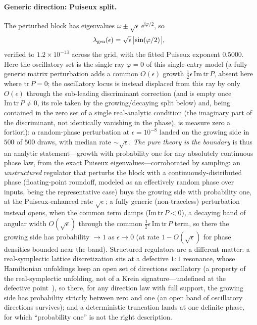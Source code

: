 ﻿\documentclass[11pt]{article}
\newcommand{\ee}{\mathrm{e}}
\newcommand{\ii}{\mathrm{i}}
\theoremstyle{remark}
\begin{document}
\paragraph{Generic direction: Puiseux split.} The perturbed block
has eigenvalues $\omega\pm\sqrt{\epsilon}\,\ee^{\ii\varphi/2}$, so
\begin{equation}
\lambda_{\rm gen}(\epsilon)=\sqrt{\epsilon}\,\bigl|\sin(\varphi/2)
\bigr|,
\label{eq:genlaw}
\end{equation}
verified to $1.2\times10^{-13}$ across the grid, with the fitted
Puiseux exponent $0.5000$. Here the oscillatory set is the single
ray $\varphi=0$ of this single-entry model (a fully generic matrix
perturbation adds a common $O(\epsilon)$ growth $\tfrac12\epsilon\,
\mathrm{Im}\,\mathrm{tr}\,P$, absent here where $\mathrm{tr}\,P=0$; the
oscillatory locus is instead displaced from this ray by only $O(\epsilon)$
through the sub-leading discriminant correction (and is empty once $\mathrm{Im}\,\mathrm{tr}\,P\neq0$, its role taken by the
growing/decaying split below) and, being contained in the zero set of a single real-analytic
condition (the imaginary part of the discriminant, not identically
vanishing in the phase), is measure zero a fortiori): a random-phase perturbation at $\epsilon=10^{-8}$
landed on the growing side in $500$ of $500$ draws, with median
rate $\sim\sqrt\epsilon$. \emph{The pure theory is the boundary}
is thus an analytic statement---growth with probability one for
any absolutely continuous phase law, from the exact Puiseux
eigenvalues---corroborated by sampling: an \emph{unstructured} regulator
that perturbs the block with a continuously-distributed phase
(floating-point roundoff, modeled as an effectively random phase over inputs,
being the representative case) buys the growing
side with probability one, at the Puiseux-enhanced rate $\sqrt\epsilon$;
a fully generic (non-traceless) perturbation instead opens, when the common
term damps ($\mathrm{Im}\,\mathrm{tr}\,P<0$), a decaying band of
angular width $O(\sqrt\epsilon)$ through the common
$\tfrac12\epsilon\,\mathrm{Im}\,\mathrm{tr}\,P$ term, so there the growing
side has probability $\to1$ as $\epsilon\to0$ (at rate $1-O(\sqrt\epsilon)$ for
phase densities bounded near the band).
Structured regulators are a different matter: a real-symplectic lattice
discretization sits at a defective $1{:}1$ resonance, whose Hamiltonian
unfoldings keep an open set of directions oscillatory (a property of the
real-symplectic unfolding, not of a Krein signature---undefined at the
defective point~\cite{KreinTheory}), so there, for any direction law with full
support, the growing side has probability
strictly between zero and one (an open band of oscillatory directions
survives); and a deterministic truncation lands at one definite
phase, for which ``probability one'' is not the right
description.
\end{document}
